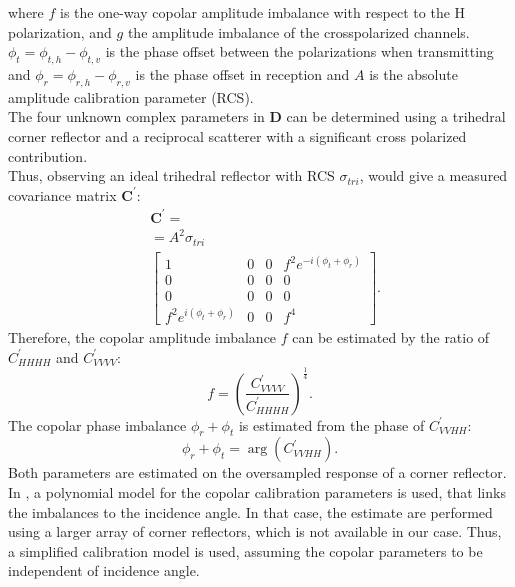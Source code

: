 where $f$ is the one-way copolar amplitude imbalance with respect to the H polarization, and $g$ the amplitude imbalance of the crosspolarized channels. $\phi_t = \phi_{t,h} -\phi_{t,v}$ is the phase offset between the polarizations when transmitting and $\phi_{r} = \phi_{r,h} -\phi_{r,v}$ is the phase offset in reception and $A$ is the absolute amplitude calibration parameter (RCS)\cite{Ainsworth2006a, Fore2015}.\\
The four unknown complex parameters in $\mathbf{D}$ can be determined using a trihedral corner reflector and a reciprocal scatterer with a significant cross polarized contribution\cite{Sarabandi1989,Pipia2009}.\\
Thus, observing an ideal trihedral reflector with RCS $\sigma_{tri}$, would give 
a measured covariance matrix $\mathbf{C^{\prime}}$:
\begin{equation}
	\begin{aligned}
	&\mathbf{C^{\prime}} =\\
	&= A^2 \sigma_{tri}\\
	&\begin{bmatrix}
		1 & 0 & 0 & f^2 e^{-i \left(\phi_t + \phi_r\right)}\\
		0 & 0 & 0 & 0\\
		0 & 0 & 0 & 0\\
		f^2 e^{i \left(\phi_t + \phi_r\right)} & 0 & 0 & f^4
	\end{bmatrix}.
	\end{aligned}
\end{equation}
Therefore, the  copolar amplitude imbalance $f$ can be estimated by the ratio of $C_{HHHH}^\prime$ and $C_{VVVV}^\prime$:
\begin{equation}
	f = \left(\frac{C^{\prime}_{VVVV}}{C^{\prime}_{HHHH}}\right)^{\frac{1}{4}}.
\end{equation}
The copolar phase imbalance $\phi_r + \phi_t$ is estimated from the phase of $C_{VVHH}^{\prime}$:
\begin{equation}
	\phi_r + \phi_t = \operatorname{arg}\left(C_{VVHH}^\prime\right).
\end{equation}
Both parameters are estimated on the oversampled response of a corner reflector. In \cite{Fore2015}, a polynomial model for the copolar calibration parameters is used, that links the imbalances to the incidence angle. In that case, the estimate are performed using a larger array of corner reflectors, which is not available in our case. Thus, a simplified calibration model is used, assuming the copolar parameters to be independent of incidence angle.\\ 
